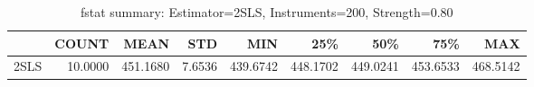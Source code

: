 \begin{table}[ht]
\centering
\caption{fstat summary: Estimator=2SLS, Instruments=200, Strength=0.80}
\begin{tabular}{lrrrrrrrr}
\toprule
 & COUNT & MEAN & STD & MIN & 25\% & 50\% & 75\% & MAX \\
\midrule
2SLS & 10.0000 & 451.1680 & 7.6536 & 439.6742 & 448.1702 & 449.0241 & 453.6533 & 468.5142 \\
\bottomrule
\end{tabular}
\end{table}
